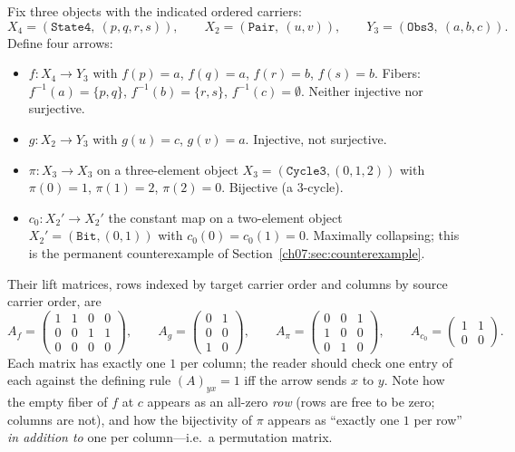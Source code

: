 \begin{example}\label{ch07:ex:quartet}
Fix three objects with the indicated ordered carriers:
\[
X_4=(\texttt{State4},\ (p,q,r,s)),\qquad
X_2=(\texttt{Pair},\ (u,v)),\qquad
Y_3=(\texttt{Obs3},\ (a,b,c)).
\]
Define four arrows:
\begin{itemize}
\item[(R1)] $f:X_4\to Y_3$ with $f(p)=a$, $f(q)=a$, $f(r)=b$, $f(s)=b$.
  Fibers: $f^{-1}(a)=\{p,q\}$, $f^{-1}(b)=\{r,s\}$, $f^{-1}(c)=\emptyset$.
  Neither injective nor surjective.
\item[(R2)] $g:X_2\to Y_3$ with $g(u)=c$, $g(v)=a$. Injective, not
  surjective.
\item[(R3)] $\pi:X_3\to X_3$ on a three-element object
  $X_3=(\texttt{Cycle3},(0,1,2))$ with $\pi(0)=1$, $\pi(1)=2$, $\pi(2)=0$.
  Bijective (a $3$-cycle).
\item[(R4)] $c_0:X_2'\to X_2'$ the constant map on a two-element object
  $X_2'=(\texttt{Bit},(0,1))$ with $c_0(0)=c_0(1)=0$. Maximally collapsing;
  this is the permanent counterexample of
  Section~\ref{ch07:sec:counterexample}.
\end{itemize}
Their lift matrices, rows indexed by target carrier order and columns by
source carrier order, are
\[
A_f=\begin{pmatrix}1&1&0&0\\0&0&1&1\\0&0&0&0\end{pmatrix},\qquad
A_g=\begin{pmatrix}0&1\\0&0\\1&0\end{pmatrix},\qquad
A_\pi=\begin{pmatrix}0&0&1\\1&0&0\\0&1&0\end{pmatrix},\qquad
A_{c_0}=\begin{pmatrix}1&1\\0&0\end{pmatrix}.
\]
Each matrix has exactly one $1$ per column; the reader should check one entry
of each against the defining rule $(A)_{yx}=1$ iff the arrow sends $x$ to
$y$. Note how the empty fiber of $f$ at $c$ appears as an all-zero \emph{row}
(rows are free to be zero; columns are not), and how the bijectivity of
$\pi$ appears as ``exactly one $1$ per row'' \emph{in addition to} one per
column---i.e.\ a permutation matrix.
\end{example}

